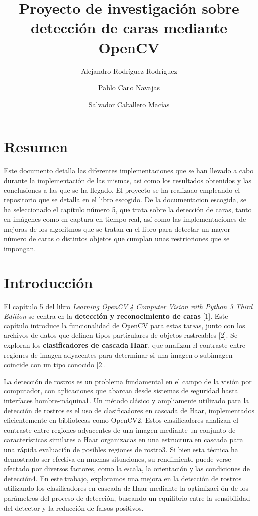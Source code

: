 \documentclass[a4paper]{article}
\title{Proyecto de investigación sobre detección de caras mediante OpenCV}
\author{Alejandro Rodríguez Rodríguez \and Pablo Cano Navajas \and Salvador Caballero Macías}
\begin{document}
\maketitle

\newpage
\tableofcontents

\newpage
\section*{Resumen}

Este documento detalla las diferentes implementaciones que se han llevado a cabo durante la implementación de las mismas, asi como los resultados obtenidos y las conclusiones a las que se ha llegado. El proyecto se ha realizado empleando el repositorio\cite{1} que se detalla en el libro escogido\cite{2}.
De la documentacion escogida, se ha seleccionado el capítulo número 5, que trata sobre la detección de caras, tanto en imágenes como en captura en tiempo real, así como las implementaciones de mejoras de los algoritmos que se tratan en el libro para detectar un mayor número de caras o distintos objetos que cumplan unas restricciones que se impongan.

\section{Introducción}

El capítulo 5 del libro \textit{Learning OpenCV 4 Computer Vision with Python 3 Third Edition} \cite{1} se centra en la \textbf{detección y reconocimiento de caras} [1]. Este capítulo introduce la funcionalidad de OpenCV para estas tareas, junto con los archivos de datos que definen tipos particulares de objetos rastreables [2]. Se exploran los \textbf{clasificadores de cascada Haar}, que analizan el contraste entre regiones de imagen adyacentes para determinar si una imagen o subimagen coincide con un tipo conocido [2].

La detección de rostros es un problema fundamental en el campo de la visión por computador, con aplicaciones que abarcan desde sistemas de seguridad
hasta interfaces hombre-máquina1. Un método clásico y ampliamente utilizado
para la detección de rostros es el uso de clasificadores en cascada de Haar,
implementados eficientemente en bibliotecas como OpenCV2. Estos clasificadores
analizan el contraste entre regiones adyacentes de una imagen mediante un
conjunto de características similares a Haar organizadas en una estructura en
cascada para una rápida evaluación de posibles regiones de rostro3. Si bien esta
técnica ha demostrado ser efectiva en muchas situaciones, su rendimiento puede
verse afectado por diversos factores, como la escala, la orientación y las condiciones
de detección4. En este trabajo, exploramos una mejora en la detección
de rostros utilizando los clasificadores en cascada de Haar mediante la optimizaci
ón de los parámetros del proceso de detección, buscando un equilibrio entre
la sensibilidad del detector y la reducción de falsos positivos.
\end{document}
